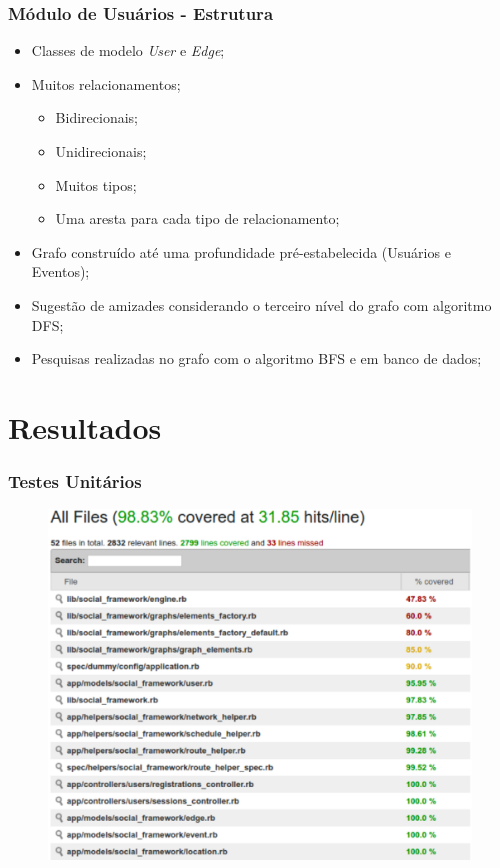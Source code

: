 \documentclass{beamer}
\begin{document}
\begin{frame}
\frametitle{Módulo de Usuários - Estrutura}

\begin{itemize}
	\item Classes de modelo \textit{User} e \textit{Edge};
	\item Muitos relacionamentos;
	\begin{itemize}
		\item Bidirecionais;
		\item Unidirecionais;
		\item Muitos tipos;
		\item Uma aresta para cada tipo de relacionamento;
	\end{itemize}
	\item Grafo construído até uma profundidade pré-estabelecida (Usuários e Eventos);
	\item Sugestão de amizades considerando o terceiro nível do grafo com algoritmo DFS;
	\item Pesquisas realizadas no grafo com o algoritmo BFS e em banco de dados;
\end{itemize}

\end{frame}

\section{Resultados}

\begin{frame}
\frametitle{Testes Unitários}

\begin{figure}[h]
	\centering
	\includegraphics[scale=0.35]{figuras/cobertura.eps}
\end{figure}

\end{frame}
\end{document}
